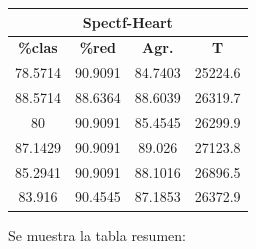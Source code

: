 \documentclass[11pt,a4paper]{article}
\theoremstyle{definition}
\begin{document}
\begin{tabbing}
{		\begin{tabular}{|c|c|c|c|}
			\hline
			\multicolumn{4}{|c|}{\textbf{Spectf-Heart}} \\ \hline
			\textbf{\%clas} & \textbf{\%red} & \textbf{Agr.} & \textbf{T} \\ \hline 
			78.5714 & 90.9091 & 84.7403 & 25224.6 \\ \hline
88.5714 & 88.6364 & 88.6039 & 26319.7 \\ \hline
80 & 90.9091 & 85.4545 & 26299.9 \\ \hline
87.1429 & 90.9091 & 89.026 & 27123.8 \\ \hline
85.2941 & 90.9091 & 88.1016 & 26896.5 \\ \hline
83.916 & 90.4545 & 87.1853 & 26372.9 \\ \hline
		\end{tabular}
		}
	\end{tabbing}
	
	
	Se muestra la tabla resumen:
	
\end{document}
